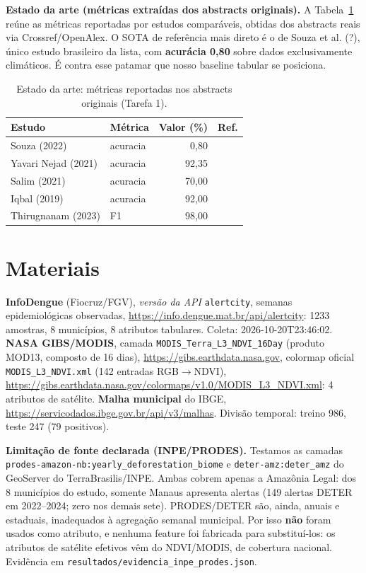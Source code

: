 \documentclass[12pt,a4paper]{article}
\begin{document}
\textbf{Estado da arte (métricas extraídas dos abstracts originais).} A
Tabela~\ref{tab:sota} reúne as métricas reportadas por estudos comparáveis,
obtidas dos abstracts reais via Crossref/OpenAlex. O SOTA de referência mais
direto é o de Souza et al. (?), único estudo brasileiro
da lista, com \textbf{acurácia 0,80} sobre dados
exclusivamente climáticos. É contra esse patamar que nosso baseline tabular se
posiciona.

\begin{table}[h]
\centering
\caption{Estado da arte: métricas reportadas nos abstracts originais (Tarefa 1).}
\label{tab:sota}
\begin{tabular}{llrr}
\toprule
Estudo & Métrica & Valor (\%) & Ref. \\
\midrule
    Souza (2022) & acuracia & 0,80 & \cite{10.1016/j.eswa.2021.116324} \\
    Yavari Nejad (2021) & acuracia & 92,35 & \cite{10.1186/s12911-021-01493-y} \\
    Salim (2021) & acuracia & 70,00 & \cite{10.1038/s41598-020-79193-2} \\
    Iqbal (2019) & acuracia & 92,00 & \cite{10.31449/inf.v43i3.1548} \\
    Thirugnanam (2023) & F1 & 98,00 & \cite{10.18280/ria.370521} \\
\bottomrule
\end{tabular}
\end{table}

\section{Materiais}
\textbf{InfoDengue} (Fiocruz/FGV), \emph{versão da API} \texttt{alertcity},
semanas epidemiológicas observadas, \url{https://info.dengue.mat.br/api/alertcity}:
1233 amostras, 8 municípios, 8
atributos tabulares. Coleta: 2026-10-20T23:46:02.
\textbf{NASA GIBS/MODIS}, camada \texttt{MODIS\_Terra\_L3\_NDVI\_16Day}
(produto MOD13, composto de 16 dias), \url{https://gibs.earthdata.nasa.gov},
colormap oficial \texttt{MODIS\_L3\_NDVI.xml} (142 entradas RGB$\to$NDVI),
\url{https://gibs.earthdata.nasa.gov/colormaps/v1.0/MODIS\_L3\_NDVI.xml}:
4 atributos de satélite.
\textbf{Malha municipal} do IBGE, \url{https://servicodados.ibge.gov.br/api/v3/malhas}.
Divisão temporal: treino 986, teste 247 (79 positivos).

\textbf{Limitação de fonte declarada (INPE/PRODES).} Testamos as camadas
\texttt{prodes-amazon-nb:yearly\_deforestation\_biome} e \texttt{deter-amz:deter\_amz}
do GeoServer do TerraBrasilis/INPE. Ambas cobrem apenas a Amazônia Legal: dos
8 municípios do estudo, somente Manaus apresenta alertas
(149 alertas DETER em 2022--2024; zero nos demais sete). PRODES/DETER são,
ainda, anuais e estaduais, inadequados à agregação semanal municipal. Por isso
\textbf{não} foram usados como atributo, e nenhuma feature foi fabricada para
substituí-los: os atributos de satélite efetivos vêm do NDVI/MODIS, de cobertura
nacional. Evidência em \texttt{resultados/evidencia\_inpe\_prodes.json}.
\end{document}

